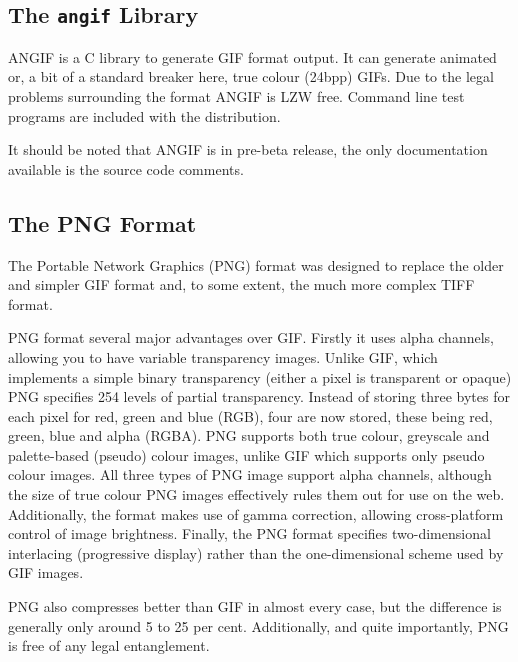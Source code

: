 \documentclass[twoside,11pt]{article}
\newcommand{\htmladdnormallink}[2]{#1}
\newcommand{\htmlref}[2]{#1}
\newcommand{\xlabel}[1]{}
\begin{document}
\subsection{\xlabel{sc15_libangif}The {\tt angif} Library\label{sc15_libangif}}

\htmladdnormallink{ANGIF}{http://phil.ipal.org/freeware/angif/} is a C library to generate GIF format output. It can generate animated or, a bit of a standard breaker here, true colour (24bpp) GIFs. Due to the \htmlref{legal problems}{sc15_giflegal} surrounding the format ANGIF is LZW free. Command line test programs are included with the distribution.

It should be noted that ANGIF is in pre-beta release, the only documentation available is the source code comments. 

\subsection{\xlabel{sc15_libpng}The PNG Format\label{sc15_libpng}}

The \htmladdnormallink{Portable Network Graphics}{http://www.libpng.org/pub/png/} (PNG) format was designed to replace the older and simpler \htmlref{GIF format}{sc15_libungif} and, to some extent, the much more complex \htmlref{TIFF format}{sc15_libjpeg}.

PNG format several major advantages over GIF. Firstly it uses alpha channels, allowing you to have variable transparency images. Unlike GIF, which implements a simple binary transparency (either a pixel is transparent or opaque) PNG specifies 254 levels of partial transparency. Instead of storing three bytes for each pixel for red, green and blue (RGB), four are now stored, these being red, green, blue and alpha (RGBA). PNG supports both true colour, greyscale and palette-based (pseudo) colour images, unlike GIF which supports only pseudo colour images. All three types of PNG image support alpha channels, although the size of true colour PNG images effectively rules them out for use on the web. Additionally, the format makes use of gamma correction, allowing cross-platform control of image brightness. Finally, the PNG format specifies two-dimensional interlacing (progressive display) rather than the one-dimensional scheme used by GIF images. 

PNG also compresses better than GIF in almost every case, but the difference is generally only around 5 to 25 per cent. Additionally, and quite importantly, PNG is free of any \htmlref{legal entanglement}{sc15_giflegal}.
\end{document}
